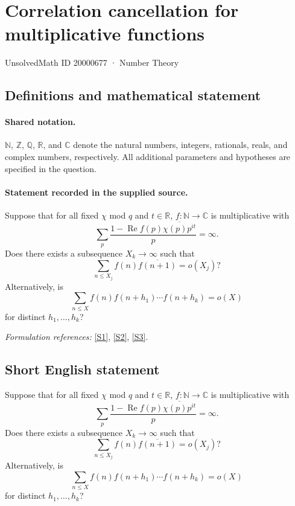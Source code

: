 \documentclass[11pt]{article}
\newcommand{\R}{\mathbb R}
\newcommand{\N}{\mathbb N}
\newcommand{\C}{\mathbb C}
\newcommand{\sref}[2]{\hyperlink{source:#1:#2}{[S#2]}}
\begin{document}
\setcounter{section}{20000676}
\section{Correlation cancellation for multiplicative functions}\label{20000677}
{\small UnsolvedMath ID 20000677 · Number Theory}
\subsection{Definitions and mathematical statement}

\paragraph{Shared notation.}$\mathbb N$, $\mathbb Z$, $\mathbb Q$, $\mathbb R$, and $\mathbb C$ denote the natural numbers, integers, rationals, reals, and complex numbers, respectively. All additional parameters and hypotheses are specified in the question.


\paragraph{Statement recorded in the supplied source.}
Suppose that for all fixed $\chi$ mod $q$ and $t \in \R$, $f:\N \to \C$ is multiplicative with
\begin{equation*}
 \sum_{p} \frac{1 - \operatorname{Re} f(p) \overline{\chi(p) p^{it}}}{p} = \infty.
\end{equation*}
Does there exists a subsequence $X_k \to \infty$ such that
\begin{equation*}
 \sum_{n \leq X_j} f(n) \overline{f(n+1)} = o(X_j)?
\end{equation*}
Alternatively, is
\begin{equation*}
 \sum_{n\leq X} f(n) f(n+h_1) \cdots f(n+h_k) = o(X)
\end{equation*}
for distinct $h_1, \dots, h_k$?
\par\smallskip\textit{Formulation references:} \sref{20000677}{1}, \sref{20000677}{2}, \sref{20000677}{3}.
\subsection{Short English statement}
Suppose that for all fixed $\chi$ mod $q$ and $t \in \R$, $f:\N \to \C$ is multiplicative with
\begin{equation*}
 \sum_{p} \frac{1 - \operatorname{Re} f(p) \overline{\chi(p) p^{it}}}{p} = \infty.
\end{equation*}
Does there exists a subsequence $X_k \to \infty$ such that
\begin{equation*}
 \sum_{n \leq X_j} f(n) \overline{f(n+1)} = o(X_j)?
\end{equation*}
Alternatively, is
\begin{equation*}
 \sum_{n\leq X} f(n) f(n+h_1) \cdots f(n+h_k) = o(X)
\end{equation*}
for distinct $h_1, \dots, h_k$?
\end{document}
